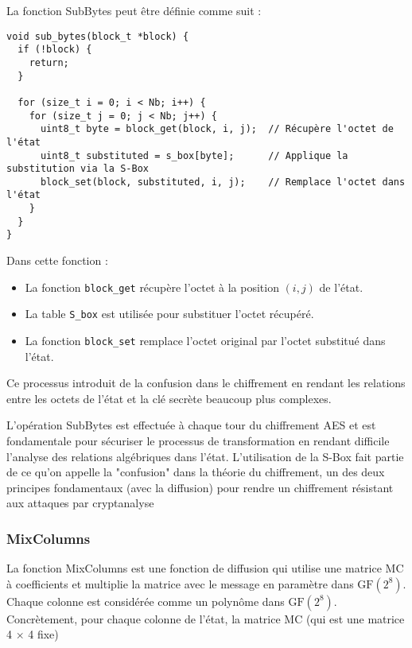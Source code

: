 \documentclass[a4paper, 10pt]{article}
\begin{document}
La fonction SubBytes peut être définie comme suit :
\small{
\begin{verbatim}
void sub_bytes(block_t *block) {
  if (!block) {
    return;
  }

  for (size_t i = 0; i < Nb; i++) {
    for (size_t j = 0; j < Nb; j++) {
      uint8_t byte = block_get(block, i, j);  // Récupère l'octet de l'état
      uint8_t substituted = s_box[byte];      // Applique la substitution via la S-Box
      block_set(block, substituted, i, j);    // Remplace l'octet dans l'état
    }
  }
}
\end{verbatim}
}
Dans cette fonction :
\begin{itemize}
  \item La fonction \texttt{block\_get} récupère l'octet à la position \( (i,j) \) de l'état.
  \item La table \texttt{S\_box} est utilisée pour substituer l'octet récupéré.
  \item La fonction \texttt{block\_set} remplace l'octet original par l'octet substitué dans l'état.
\end{itemize}

Ce processus introduit de la confusion dans le chiffrement en rendant les relations entre les octets de l'état et la clé secrète beaucoup plus complexes.

L'opération SubBytes est effectuée à chaque tour du chiffrement AES et est fondamentale pour sécuriser le processus de transformation en rendant difficile l'analyse des relations algébriques dans l'état. L'utilisation de la S-Box fait partie de ce qu'on appelle la "confusion" dans la théorie du chiffrement, un des deux principes fondamentaux (avec la diffusion) pour rendre un chiffrement résistant aux attaques par cryptanalyse
  
\subsubsection{MixColumns}
  La fonction MixColumns est une fonction de diffusion qui utilise une matrice MC à 
  coefficients et multiplie la matrice avec le message en paramètre dans \( \text{GF}(2^8) \). 
  Chaque colonne est considérée comme un polynôme dans \( \text{GF}(2^8) \). 
  Concrètement, pour chaque colonne de l'état, la matrice MC (qui est une matrice 4 $\times$ 4 fixe) 
\end{document}

